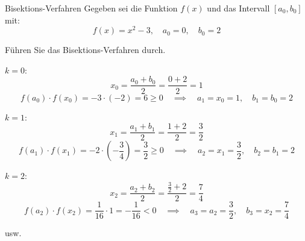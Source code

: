 \begin{example}{Bisektions-Verfahren}
    Gegeben sei die Funktion $f(x)$ und das Intervall $[a_0, b_0]$ mit: 
    \[ 
        f(x) = x^2 - 3, \quad a_0 = 0, \quad b_0 = 2
    \]
    
    Führen Sie das Bisektions-Verfahren durch.
    
    \exampleseparator
    
    $k = 0$:
    \[ 
        x_0 = \frac{a_0 + b_0}{2} = \frac{0 + 2}{2} = 1
    \]
    \[ 
        f(a_0) \cdot f(x_0) = -3 \cdot (-2) = 6 \geq 0 \quad \implies \quad a_1 = x_0 = 1, \quad b_1 = b_0 = 2
    \]
    
    $k = 1$:
    \[ 
        x_1 = \frac{a_1 + b_1}{2} = \frac{1 + 2}{2} = \frac{3}{2}
    \]
    \[ 
        f(a_1) \cdot f(x_1) = -2 \cdot \left(-\frac{3}{4}\right) = \frac{3}{2} \geq 0 \quad \implies \quad a_2 = x_1 = \frac{3}{2}, \quad b_2 = b_1 = 2
    \]
    
    $k = 2$:
    \[ 
        x_2 = \frac{a_2 + b_2}{2} = \frac{\frac{3}{2} + 2}{2} = \frac{7}{4}
    \]
    \[ 
        f(a_2) \cdot f(x_2) = \frac{1}{16} \cdot 1 = -\frac{1}{16} < 0 \quad \implies \quad a_3 = a_2 = \frac{3}{2}, \quad b_3 = x_2 = \frac{7}{4}
    \]
    
    usw.
    
    \begin{center}
\end{center}
\end{example}
